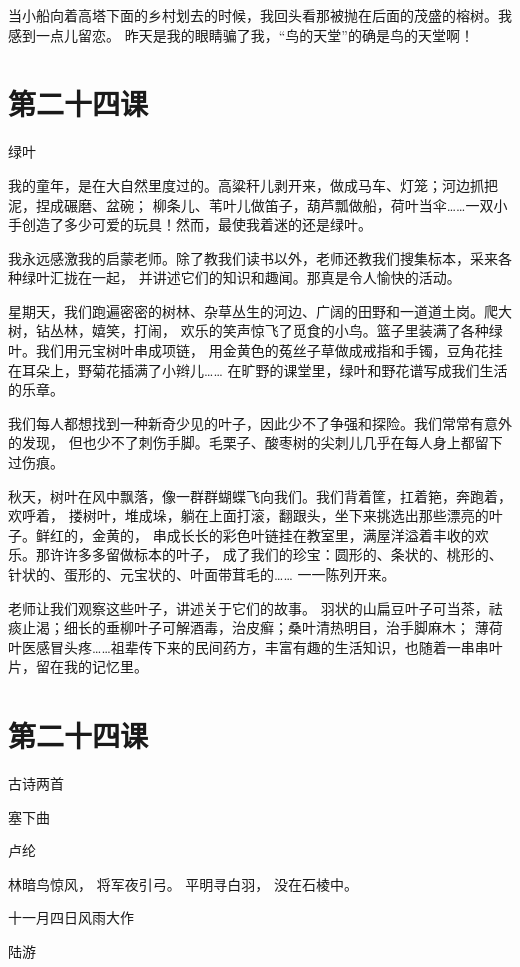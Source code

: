 \documentclass[12pt,UTF8]{ctexbook}
\begin{document}
当小船向着高塔下面的乡村划去的时候，我回头看那被抛在后面的茂盛的榕树。我感到一点儿留恋。
昨天是我的眼睛骗了我，“鸟的天堂”的确是鸟的天堂啊！

\section{第二十四课}

绿叶

我的童年，是在大自然里度过的。高粱秆儿剥开来，做成马车、灯笼；河边抓把泥，捏成碾磨、盆碗；
柳条儿、苇叶儿做笛子，葫芦瓢做船，荷叶当伞……一双小手创造了多少可爱的玩具！然而，最使我着迷的还是绿叶。

我永远感激我的启蒙老师。除了教我们读书以外，老师还教我们搜集标本，采来各种绿叶汇拢在一起，
并讲述它们的知识和趣闻。那真是令人愉快的活动。

星期天，我们跑遍密密的树林、杂草丛生的河边、广阔的田野和一道道土岗。爬大树，钻丛林，嬉笑，打闹，
欢乐的笑声惊飞了觅食的小鸟。篮子里装满了各种绿叶。我们用元宝树叶串成项链，
用金黄色的菟丝子草做成戒指和手镯，豆角花挂在耳朵上，野菊花插满了小辫儿……
在旷野的课堂里，绿叶和野花谱写成我们生活的乐章。

我们每人都想找到一种新奇少见的叶子，因此少不了争强和探险。我们常常有意外的发现，
但也少不了刺伤手脚。毛栗子、酸枣树的尖刺儿几乎在每人身上都留下过伤痕。

秋天，树叶在风中飘落，像一群群蝴蝶飞向我们。我们背着筐，扛着筢，奔跑着，欢呼着，
搂树叶，堆成垛，躺在上面打滚，翻跟头，坐下来挑选出那些漂亮的叶子。鲜红的，金黄的，
串成长长的彩色叶链挂在教室里，满屋洋溢着丰收的欢乐。那许许多多留做标本的叶子，
成了我们的珍宝：圆形的、条状的、桃形的、针状的、蛋形的、元宝状的、叶面带茸毛的……
一一陈列开来。

老师让我们观察这些叶子，讲述关于它们的故事。
羽状的山扁豆叶子可当茶，祛痰止渴；细长的垂柳叶子可解酒毒，治皮癣；桑叶清热明目，治手脚麻木；
薄荷叶医感冒头疼……祖辈传下来的民间药方，丰富有趣的生活知识，也随着一串串叶片，留在我的记忆里。

\section{第二十四课}

古诗两首

塞下曲

卢纶

林暗鸟惊风，
将军夜引弓。
平明寻白羽，
没在石棱中。

十一月四日风雨大作

陆游
\end{document}
